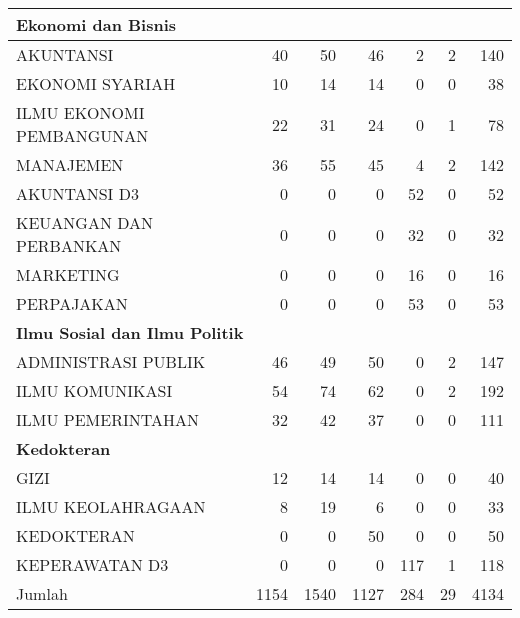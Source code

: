 \documentclass[
]{book}
\begin{document}
\begin{table}[H]
{\begin{tabular}{l|r|r|r|r|r|r}
\hline
\multicolumn{7}{l}{\textbf{Ekonomi dan Bisnis}}\\
\hline
\hspace{1em}AKUNTANSI & 40 & 50 & 46 & 2 & 2 & 140\\
\hline
\hspace{1em}EKONOMI SYARIAH & 10 & 14 & 14 & 0 & 0 & 38\\
\hline
\hspace{1em}ILMU EKONOMI PEMBANGUNAN & 22 & 31 & 24 & 0 & 1 & 78\\
\hline
\hspace{1em}MANAJEMEN & 36 & 55 & 45 & 4 & 2 & 142\\
\hline
\hspace{1em}AKUNTANSI D3 & 0 & 0 & 0 & 52 & 0 & 52\\
\hline
\hspace{1em}KEUANGAN DAN PERBANKAN & 0 & 0 & 0 & 32 & 0 & 32\\
\hline
\hspace{1em}MARKETING & 0 & 0 & 0 & 16 & 0 & 16\\
\hline
\hspace{1em}PERPAJAKAN & 0 & 0 & 0 & 53 & 0 & 53\\
\hline
\multicolumn{7}{l}{\textbf{Ilmu Sosial dan Ilmu Politik}}\\
\hline
\hspace{1em}ADMINISTRASI PUBLIK & 46 & 49 & 50 & 0 & 2 & 147\\
\hline
\hspace{1em}ILMU KOMUNIKASI & 54 & 74 & 62 & 0 & 2 & 192\\
\hline
\hspace{1em}ILMU PEMERINTAHAN & 32 & 42 & 37 & 0 & 0 & 111\\
\hline
\multicolumn{7}{l}{\textbf{Kedokteran}}\\
\hline
\hspace{1em}GIZI & 12 & 14 & 14 & 0 & 0 & 40\\
\hline
\hspace{1em}ILMU KEOLAHRAGAAN & 8 & 19 & 6 & 0 & 0 & 33\\
\hline
\hspace{1em}KEDOKTERAN & 0 & 0 & 50 & 0 & 0 & 50\\
\hline
\hspace{1em}KEPERAWATAN D3 & 0 & 0 & 0 & 117 & 1 & 118\\
\hline
Jumlah & 1154 & 1540 & 1127 & 284 & 29 & 4134\\
\hline
\end{tabular}}
\end{table}
\end{document}

